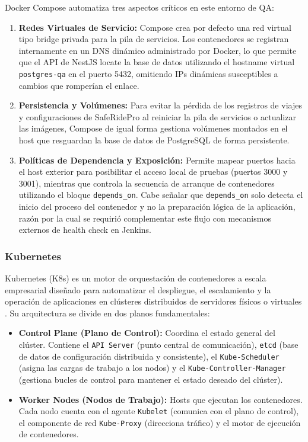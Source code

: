 \documentclass{article}
\begin{document}
Docker Compose automatiza tres aspectos críticos en este entorno de QA:
\begin{enumerate}[leftmargin=*]
    \item \textbf{Redes Virtuales de Servicio:} Compose crea por defecto una red virtual tipo bridge privada para la pila de servicios. Los contenedores se registran internamente en un DNS dinámico administrado por Docker, lo que permite que el API de NestJS locate la base de datos utilizando el hostname virtual \texttt{postgres-qa} en el puerto 5432, omitiendo IPs dinámicas susceptibles a cambios que romperían el enlace.
    \item \textbf{Persistencia y Volúmenes:} Para evitar la pérdida de los registros de viajes y configuraciones de SafeRidePro al reiniciar la pila de servicios o actualizar las imágenes, Compose de igual forma gestiona volúmenes montados en el host que resguardan la base de datos de PostgreSQL de forma persistente.
    \item \textbf{Políticas de Dependencia y Exposición:} Permite mapear puertos hacia el host exterior para posibilitar el acceso local de pruebas (puertos 3000 y 3001), mientras que controla la secuencia de arranque de contenedores utilizando el bloque \texttt{depends\_on}. Cabe señalar que \texttt{depends\_on} solo detecta el inicio del proceso del contenedor y no la preparación lógica de la aplicación, razón por la cual se requirió complementar este flujo con mecanismos externos de health check en Jenkins.
\end{enumerate}

\subsubsection*{Kubernetes}
Kubernetes (K8s) es un motor de orquestación de contenedores a escala empresarial diseñado para automatizar el despliegue, el escalamiento y la operación de aplicaciones en clústeres distribuidos de servidores físicos o virtuales \cite{kubernetesoverview}. Su arquitectura se divide en dos planos fundamentales:
\begin{itemize}[leftmargin=*]
    \item \textbf{Control Plane (Plano de Control):} Coordina el estado general del clúster. Contiene el \texttt{API Server} (punto central de comunicación), \texttt{etcd} (base de datos de configuración distribuida y consistente), el \texttt{Kube-Scheduler} (asigna las cargas de trabajo a los nodos) y el \texttt{Kube-Controller-Manager} (gestiona bucles de control para mantener el estado deseado del clúster).
    \item \textbf{Worker Nodes (Nodos de Trabajo):} Hosts que ejecutan los contenedores. Cada nodo cuenta con el agente \texttt{Kubelet} (comunica con el plano de control), el componente de red \texttt{Kube-Proxy} (direcciona tráfico) y el motor de ejecución de contenedores.
\end{itemize}
\end{document}

